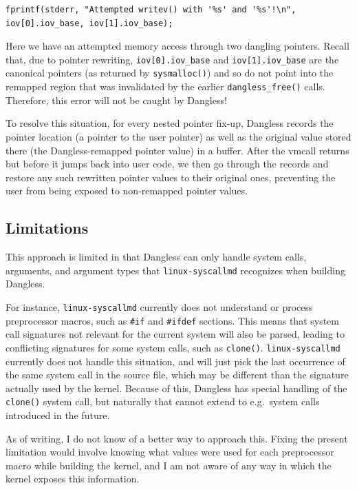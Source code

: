 \begin{lstlisting}
fprintf(stderr, "Attempted writev() with '%s' and '%s'!\n", iov[0].iov_base, iov[1].iov_base);
\end{lstlisting}

Here we have an attempted memory access through two dangling pointers. Recall that, due to pointer rewriting, \lstinline|iov[0].iov_base| and \lstinline|iov[1].iov_base| are the canonical pointers (as returned by \lstinline!sysmalloc()!) and so do not point into the remapped region that was invalidated by the earlier \lstinline!dangless_free()! calls. Therefore, this error will not be caught by Dangless!

To resolve this situation, for every nested pointer fix-up, Dangless records the pointer location (a pointer to the user pointer) as well as the original value stored there (the Dangless-remapped pointer value) in a buffer. After the vmcall returns but before it jumps back into user code, we then go through the records and restore any such rewritten pointer values to their original ones, preventing the user from being exposed to non-remapped pointer values.

\subsection{Limitations}

This approach is limited in that Dangless can only handle system calls, arguments, and argument types that \texttt{linux-syscallmd} recognizes when building Dangless.

For instance, \texttt{linux-syscallmd} currently does not understand or process preprocessor macros, such as \lstinline!#if! and \lstinline!#ifdef! sections. This means that system call signatures not relevant for the current system will also be parsed, leading to conflicting signatures for some system calls, such as \lstinline!clone()!. \texttt{linux-syscallmd} currently does not handle this situation, and will just pick the last occurrence of the same system call in the source file, which may be different than the signature actually used by the kernel. Because of this, Dangless has special handling of the \lstinline!clone()! system call, but naturally that cannot extend to e.g.\ system calls introduced in the future.

As of writing, I do not know of a better way to approach this. Fixing the present limitation would involve knowing what values were used for each preprocessor macro while building the kernel, and I am not aware of any way in which the kernel exposes this information.

